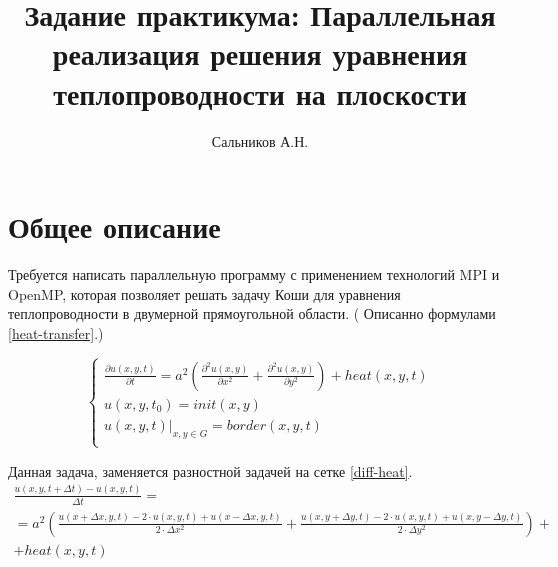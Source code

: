 \documentclass[10pt, a4paper]{article}
\title{Задание практикума: Параллельная реализация решения уравнения теплопроводности на плоскости}
\author{Сальников А.Н.}
\date{}
\begin{document}
\maketitle

\section{Общее описание}

Требуется написать параллельную программу с применением технологий MPI и OpenMP,
которая позволяет решать задачу Коши\cite{koshi} для уравнения теплопроводности
в двумерной прямоугольной области. ( Описанно формулами \eqref{heat-transfer}.)

\begin{equation}
\label{heat-transfer}
\left\{ 
    \begin{array}{l}
        \frac{\partial u(x,y,t)}{\partial t} = 
            a^2 \left( 
                  \frac{\partial^2 u(x,y)}{\partial x^2} +  
                  \frac{\partial^2 u(x,y)}{\partial y^2} 
                \right) +
                  heat(x,y,t) \\
        u(x,y,t_0) = init(x,y) \\
        \left. u(x,y,t) \right|_{x,y \in G} = border(x,y,t) \\
    \end{array}
\right.    
\end{equation}

Данная задача, заменяется разностной задачей на сетке \eqref{diff-heat}.
\begin{equation}
\label{diff-heat}
    \begin{array}{l}
                \frac
                { 
                    u(x,y,t+\Delta{t}) - u(x,y,t) 
                }
                {\Delta{t}} = \\
            =   a^2  
            
            \left(
                    \frac 
                    {
                     u(x+\Delta{x},y,t) - 2 \cdot u(x,y,t)  + u(x - \Delta{x},y,t)
                    }
                    {2 \cdot \Delta{x}^2 } + 

                    \frac 
                    {
                        u(x,y + \Delta{y},t) - 2 \cdot u(x,y,t) + u(x,y - \Delta{y},t)
                    }
                    {2 \cdot \Delta{y}^2}
            \right)
                + \\
                + heat(x,y,t)
          \end{array}
\end{equation}
\end{document}
